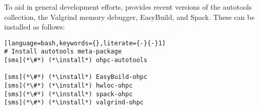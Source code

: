To aid in general development efforts, \OHPC{} provides recent versions of the \GNU{}
autotools collection, the Valgrind memory debugger, EasyBuild, and Spack. These can be installed as follows:

\begin{lstlisting}[language=bash,keywords={},literate={-}{-}1]
# Install autotools meta-package
[sms](*\#*) (*\install*) ohpc-autotools

[sms](*\#*) (*\install*) EasyBuild-ohpc
[sms](*\#*) (*\install*) hwloc-ohpc
[sms](*\#*) (*\install*) spack-ohpc
[sms](*\#*) (*\install*) valgrind-ohpc
\end{lstlisting}
